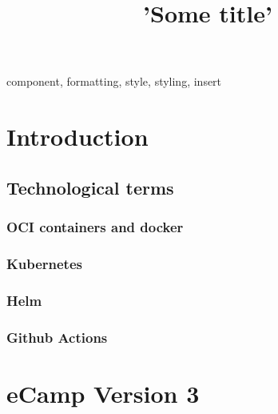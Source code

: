 \documentclass[conference]{IEEEtran}
\begin{document}
\title{'Some title'}

\author{
}

\maketitle

\begin{abstract}
	
\end{abstract}

\begin{IEEEkeywords}
	component, formatting, style, styling, insert
\end{IEEEkeywords}

\section{Introduction}

\subsection{Technological terms}

\subsubsection{OCI containers and docker}

\subsubsection{Kubernetes}

\subsubsection{Helm}

\subsubsection{Github Actions}

\section{eCamp Version 3}
\end{document}
